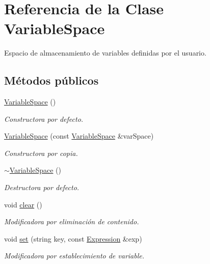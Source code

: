 \hypertarget{class_variable_space}{}\section{Referencia de la Clase Variable\+Space}
\label{class_variable_space}


Espacio de almacenamiento de variables definidas por el usuario.  


\subsection*{Métodos públicos}
\begin{DoxyCompactItemize}
\item 
\hyperlink{class_variable_space_aa5cc75308d063873297bc15dbb3df9b0}{Variable\+Space} ()
\begin{DoxyCompactList}\small\item\em Constructora por defecto. \end{DoxyCompactList}\item 
\hyperlink{class_variable_space_a61593b2566ddf90eb391bfad68c1caf0}{Variable\+Space} (const \hyperlink{class_variable_space}{Variable\+Space} \&var\+Space)
\begin{DoxyCompactList}\small\item\em Constructora por copia. \end{DoxyCompactList}\item 
\hyperlink{class_variable_space_aa84c24cfe3aff34d73704b52e3860210}{$\sim$\+Variable\+Space} ()
\begin{DoxyCompactList}\small\item\em Destructora por defecto. \end{DoxyCompactList}\item 
void \hyperlink{class_variable_space_a8fa500a305d3931fa4bbfb3f53eea771}{clear} ()
\begin{DoxyCompactList}\small\item\em Modificadora por eliminación de contenido. \end{DoxyCompactList}\item 
void \hyperlink{class_variable_space_a8283cea5dc219241f0e680137aa038ca}{set} (string key, const \hyperlink{class_expression}{Expression} \&exp)
\begin{DoxyCompactList}\small\item\em Modificadora por establecimiento de variable. \end{DoxyCompactList}\item 

\end{DoxyCompactItemize}
